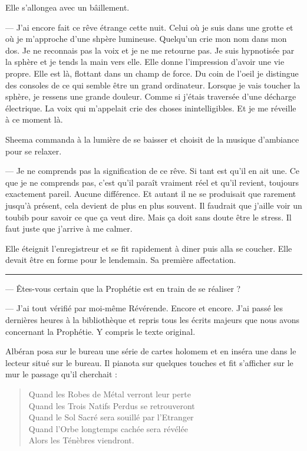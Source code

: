 \documentclass[ebook,12pt,oneside,onecolumn,openright,draft]{memoir}
\begin{document}
Elle s'allongea avec un bâillement.

--- J'ai encore fait ce rêve étrange cette nuit. Celui où je suis dans une
grotte et où je m'approche d'une shpère lumineuse. Quelqu'un crie mon nom dans
mon dos. Je ne reconnais pas la voix et je ne me retourne pas. Je suis
hypnotisée par la sphère et je tends la main vers elle. Elle donne l'impression
d'avoir une vie propre. Elle est là, flottant dans un champ de force. Du coin de
l'oeil je distingue des consoles de ce qui semble être un grand ordinateur.
Lorsque je vais toucher la sphère, je ressens une grande douleur. Comme si
j'étais traversée d'une décharge électrique. La voix qui m'appelait crie des
choses inintelligibles. Et je me réveille à ce moment là.

Sheema commanda à la lumière de se baisser et choisit de la musique d'ambiance
pour se relaxer.

--- Je ne comprends pas la signification de ce rêve. Si tant est qu'il en ait
une. Ce que je ne comprends pas, c'est qu'il paraît vraiment réel et qu'il
revient, toujours exactement pareil. Aucune différence. Et autant il ne se
produisait que rarement jusqu'à présent, cela devient de plus en plus souvent.
Il faudrait que j'aille voir un toubib pour savoir ce que ça veut dire. Mais ça
doit sans doute être le stress. Il faut juste que j'arrive à me calmer.

Elle éteignit l'enregistreur et se fit rapidement à diner puis alla se coucher.
Elle devait être en forme pour le lendemain. Sa première affectation.

\fancybreak{\pfbreakdisplay}

--- Êtes-vous certain que la Prophétie est en train de se réaliser ?

--- J'ai tout vérifié par moi-même Révérende. Encore et encore. J'ai passé les
dernières heures à la bibliothèque et repris tous les écrits majeurs que nous
avons concernant la Prophétie. Y compris le texte original.

Albéran posa sur le bureau une série de cartes holomem et en inséra une dans le
lecteur situé sur le bureau. Il pianota sur quelques touches et fit s'afficher
sur le mur le passage qu'il cherchait :

\begin{verse}

Quand les Robes de Métal verront leur perte \\
Quand les Trois Natifs Perdus se retrouveront \\
Quand le Sol Sacré sera souillé par l'Etranger \\
Quand l'Orbe longtemps cachée sera révélée \\
Alors les Ténèbres viendront.

\end{verse}
\end{document}

